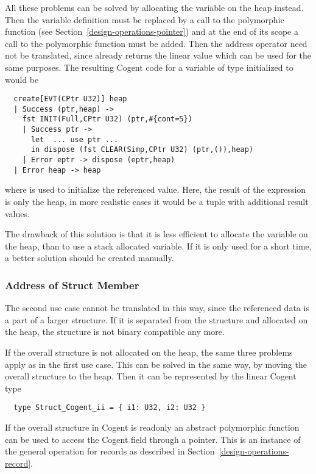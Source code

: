 All these problems can be solved by allocating the variable on the heap instead. Then the variable definition
must be replaced by a call to the polymorphic function  (see Section~\ref{design-operations-pointer}) and 
at the end of its scope a call to the polymorphic function  must be added. Then the address
operator need not be translated, since  already returns the linear value which can be 
used for the same purposes. The resulting Cogent code for a variable of type  initialized to 
would be
\begin{verbatim}
  create[EVT(CPtr U32)] heap
  | Success (ptr,heap) ->
    fst INIT(Full,CPtr U32) (ptr,#{cont=5})
    | Success ptr ->
      let  ... use ptr ...
      in dispose (fst CLEAR(Simp,CPtr U32) (ptr,()),heap)
    | Error eptr -> dispose (eptr,heap)
  | Error heap -> heap
\end{verbatim}
where  is used to initialize the referenced value. Here, the result of the expression is
only the heap, in more realistic cases it would be a tuple with additional result values.

The drawback of this solution is that it is less efficient to allocate the variable on the heap, than to use a 
stack allocated variable. If it is only used for a short time, a better solution should be created manually.

\subsubsection{Address of Struct Member}

The second use case cannot be translated in this way, since the referenced data is a part of a larger structure.
If it is separated from the structure and allocated on the heap, the structure is not binary compatible any more.

If the overall structure is not allocated on the heap, the same three problems apply as in the first use case.
This can be solved in the same way, by moving the overall structure to the heap. Then it can be represented
by the linear Cogent type
\begin{verbatim}
  type Struct_Cogent_ii = { i1: U32, i2: U32 }
\end{verbatim}

If the overall structure in Cogent is readonly an abstract polymorphic function 
can be used to access the Cogent field through a pointer. This is an instance of the general  operation
for records as described in Section~\ref{design-operations-record}.

